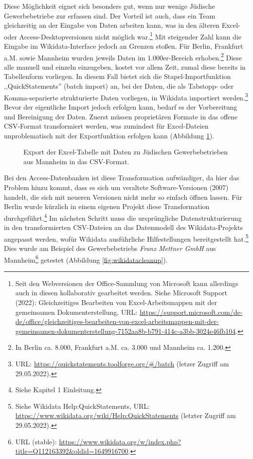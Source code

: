 Diese Möglichkeit eignet sich besonders gut, wenn nur wenige Jüdische Gewerbebetriebe zur erfassen sind. Der Vorteil ist auch, dass ein Team gleichzeitig an der Eingabe von Daten arbeiten kann, was in den älteren Excel- oder Access-Desktopversionen nicht möglich war.\footnote{Seit den Webversionen der Office-Sammlung von Microsoft kann allerdings auch in diesen kollaborativ gearbeitet werden. Siehe Microsoft Support (2022): Gleichzeitiges Bearbeiten von Excel-Arbeitsmappen mit der gemeinsamen Dokumenterstellung, URL: \url{https://support.microsoft.com/de-de/office/gleichzeitiges-bearbeiten-von-excel-arbeitsmappen-mit-der-gemeinsamen-dokumenterstellung-7152aa8b-b791-414c-a3bb-3024e46fb104}.} Mit steigender Zahl kann die Eingabe im Wikidata-Interface jedoch an Grenzen stoßen. Für Berlin, Frankfurt a.M. sowie Mannheim wurden jeweils Daten im 1.000er-Bereich erhoben.\footnote{In Berlin ca. 8.000, Frankfurt a.M. ca. 3.000 und Mannheim ca. 1.200.} Diese alle manuell und einzeln einzugeben, kostet vor allem Zeit, zumal diese bereits in Tabellenform vorliegen. In diesem Fall bietet sich die Stapel-Importfunktion ,,QuickStatements'' (batch import) an, bei der Daten, die als Tabstopp- oder Komma-separierte strukturierte Daten vorliegen, in Wikidata importiert werden.\footnote{URL: \url{https://quickstatements.toolforge.org/\#/batch} (letzer Zugriff am 29.05.2022).} Bevor der eigentliche Import jedoch erfolgen kann, bedarf es der Vorbereitung und Bereinigung der Daten. Zuerst müssen proprietären Formate in das offene CSV-Format transformiert werden, was zumindest für Excel-Dateien unproblematisch mit der Exportfunktion erfolgen kann (Abbildung \ref{fig:excelcsv}).

\begin{figure}[h]
    \centering
    \caption{Export der Excel-Tabelle mit Daten zu Jüdischen Gewerbebetrieben aus Mannheim in das CSV-Format.}
    \label{fig:excelcsv}
\end{figure}

Bei den Access-Datenbanken ist diese Transformation aufwändiger, da hier das Problem hinzu kommt, dass es sich um veraltete Software-Versionen (2007) handelt, die sich mit neueren Versionen nicht mehr so einfach öffnen lassen. Für Berlin wurde kürzlich in einem eigenen Projekt diese Transformation durchgeführt.\footnote{Siehe Kapitel 1 Einleitung.} Im nächsten Schritt muss die ursprüngliche Datenstrukturierung in den transformierten CSV-Dateien an das Datenmodell des Wikidata-Projekts angepasst werden, wofür Wikidata ausführliche Hilfestellungen bereitgestellt hat.\footnote{Siehe Wikidata Help:QuickStatements, URL: \url{https://www.wikidata.org/wiki/Help:QuickStatements} (letzter Zugriff am 29.05.2022).} Dies wurde am Beispiel des Gewerbebetriebs \textit{Franz Mettner GmbH} aus Mannheim\footnote{URL (stable): \url{https://www.wikidata.org/w/index.php?title=Q112163392\&oldid=1649916700}.} getestet (Abbildung \ref{fig:wikidatacleanup}).

